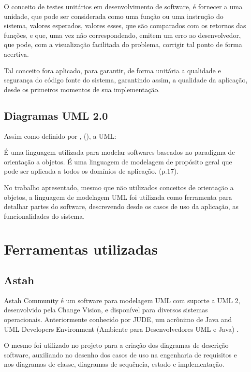 O conceito de testes unitários em desenvolvimento de software, é fornecer a uma unidade, que pode ser considerada como uma função ou uma instrução do sistema, valores esperados, valores esses, que são comparados com os retornos das funções, e que, uma vez não correspondendo, emitem um erro ao desenvolvedor, que pode, com a visualização facilitada do problema, corrigir tal ponto de forma acertiva.

Tal conceito fora aplicado, para garantir, de forma unitária a qualidade e segurança do código fonte do sistema, garantindo assim, a qualidade da aplicação, desde os primeiros momentos de sua implementação.

\section{Diagramas UML 2.0}

Assim como definido por , (\citeyear{uml_pratica}), a UML:

\begin{citacao}
    É uma linguagem utilizada para modelar softwares baseados no paradigma de orientação a objetos. É uma linguagem de modelagem de propósito geral que pode ser aplicada a todos os domínios de aplicação. (p.17).
\end{citacao}

No trabalho apresentado, mesmo que não utilizados conceitos de orientação a objetos, a linguagem de modelagem UML foi utilizada como ferramenta para detalhar partes do software, descrevendo desde os casos de uso da aplicação, as funcionalidades do sistema.

\chapter{Ferramentas utilizadas}

\section{Astah}

Astah Community é um software para modelagem UML com suporte a UML 2, desenvolvido pela Change Vision, e disponível para diversos sistemas operacionais. Anteriormente conhecido por JUDE, um acrônimo de Java and UML Developers Environment (Ambiente para Desenvolvedores UML e Java) \cite{astah_uml}.

O mesmo foi utilizado no projeto para a criação dos diagramas de descrição software, auxiliando no desenho dos casos de uso na engenharia de requisitos e nos diagramas de classe, diagramas de sequência, estado e implementação.

